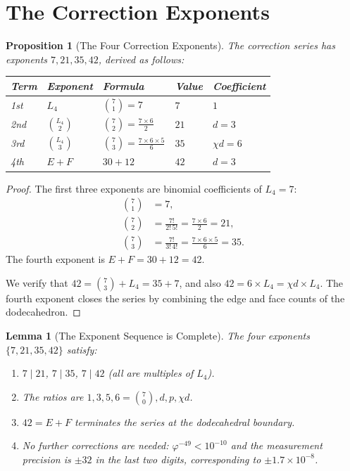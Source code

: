 \documentclass[11pt,a4paper]{article}
\theoremstyle{plain}
\newtheorem{lemma}[theorem]{Lemma}
\newtheorem{proposition}[theorem]{Proposition}
\theoremstyle{definition}
\newcommand{\vp}{\varphi}
\begin{document}
\section{The Correction Exponents}\label{sec:exponents}

\begin{proposition}[The Four Correction Exponents]\label{prop:exponents}
The correction series has exponents $7, 21, 35, 42$, derived as follows:
\begin{center}
\begin{tabular}{@{}lllll@{}}
\toprule
Term & Exponent & Formula & Value & Coefficient \\
\midrule
1st & $L_4$ & $\binom{7}{1} = 7$ & $7$ & $1$ \\
2nd & $\binom{L_4}{2}$ & $\binom{7}{2} = \frac{7 \times 6}{2}$ & $21$ & $d = 3$ \\
3rd & $\binom{L_4}{3}$ & $\binom{7}{3} = \frac{7 \times 6 \times 5}{6}$ & $35$ & $\chi d = 6$ \\
4th & $E + F$ & $30 + 12$ & $42$ & $d = 3$ \\
\bottomrule
\end{tabular}
\end{center}
\end{proposition}

\begin{proof}
The first three exponents are binomial coefficients of $L_4 = 7$:
\begin{align*}
  \binom{7}{1} &= 7, \\
  \binom{7}{2} &= \frac{7!}{2!\,5!} = \frac{7 \times 6}{2} = 21, \\
  \binom{7}{3} &= \frac{7!}{3!\,4!} = \frac{7 \times 6 \times 5}{6} = 35.
\end{align*}
The fourth exponent is $E + F = 30 + 12 = 42$.

We verify that $42 = \binom{7}{3} + L_4 = 35 + 7$, and also
$42 = 6 \times L_4 = \chi d \times L_4$.  The fourth exponent
closes the series by combining the edge and face counts of the
dodecahedron.
\end{proof}

\begin{lemma}[The Exponent Sequence is Complete]\label{lem:complete}
The four exponents $\{7, 21, 35, 42\}$ satisfy:
\begin{enumerate}[nosep]
  \item $7 \mid 21$, $7 \mid 35$, $7 \mid 42$ (all are multiples of $L_4$).
  \item The ratios are $1, 3, 5, 6 = \binom{7}{0}, d, p, \chi d$.
  \item $42 = E + F$ terminates the series at the dodecahedral boundary.
  \item No further corrections are needed: $\vp^{-49} < 10^{-10}$
    and the measurement precision is $\pm 32$ in the last two digits,
    corresponding to $\pm 1.7 \times 10^{-8}$.
\end{enumerate}
\end{lemma}
\end{document}
